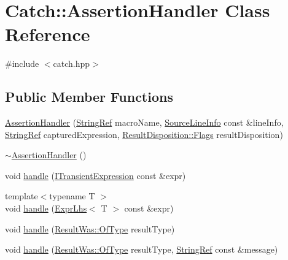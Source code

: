 \hypertarget{classCatch_1_1AssertionHandler}{}\section{Catch\+:\+:Assertion\+Handler Class Reference}
\label{classCatch_1_1AssertionHandler}


{\ttfamily \#include $<$catch.\+hpp$>$}

\subsection*{Public Member Functions}
\begin{DoxyCompactItemize}
\item 
\mbox{\hyperlink{classCatch_1_1AssertionHandler_a74627e1e399b026e9acbaf95ea673643}{Assertion\+Handler}} (\mbox{\hyperlink{classCatch_1_1StringRef}{String\+Ref}} macro\+Name, \mbox{\hyperlink{structCatch_1_1SourceLineInfo}{Source\+Line\+Info}} const \&line\+Info, \mbox{\hyperlink{classCatch_1_1StringRef}{String\+Ref}} captured\+Expression, \mbox{\hyperlink{structCatch_1_1ResultDisposition_a3396cad6e2259af326b3aae93e23e9d8}{Result\+Disposition\+::\+Flags}} result\+Disposition)
\item 
\mbox{\hyperlink{classCatch_1_1AssertionHandler_a1e839d810f6ac0fa6d127fe8350175ed}{$\sim$\+Assertion\+Handler}} ()
\item 
void \mbox{\hyperlink{classCatch_1_1AssertionHandler_a39b33cd04bf5ddaf81bd0aa64cbe65aa}{handle}} (\mbox{\hyperlink{structCatch_1_1ITransientExpression}{I\+Transient\+Expression}} const \&expr)
\item 
{\footnotesize template$<$typename T $>$ }\\void \mbox{\hyperlink{classCatch_1_1AssertionHandler_a307f27a86452decea7384a5ab524fcfd}{handle}} (\mbox{\hyperlink{classCatch_1_1ExprLhs}{Expr\+Lhs}}$<$ T $>$ const \&expr)
\item 
void \mbox{\hyperlink{classCatch_1_1AssertionHandler_af04d943755b1f27374f7edf32c190942}{handle}} (\mbox{\hyperlink{structCatch_1_1ResultWas_a624e1ee3661fcf6094ceef1f654601ef}{Result\+Was\+::\+Of\+Type}} result\+Type)
\item 
void \mbox{\hyperlink{classCatch_1_1AssertionHandler_a50c299532997985f6fce55dc63545aa4}{handle}} (\mbox{\hyperlink{structCatch_1_1ResultWas_a624e1ee3661fcf6094ceef1f654601ef}{Result\+Was\+::\+Of\+Type}} result\+Type, \mbox{\hyperlink{classCatch_1_1StringRef}{String\+Ref}} const \&message)
\item 

\end{DoxyCompactItemize}
